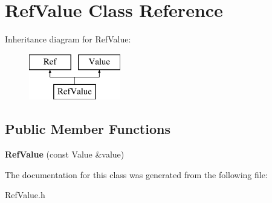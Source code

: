 \hypertarget{class_ref_value}{}\section{Ref\+Value Class Reference}
\label{class_ref_value}
Inheritance diagram for Ref\+Value\+:\begin{figure}[H]
\begin{center}
\leavevmode
\includegraphics[height=2.000000cm]{dd/df3/class_ref_value}
\end{center}
\end{figure}
\subsection*{Public Member Functions}
\begin{DoxyCompactItemize}
\item 
\mbox{\label{class_ref_value_ad87c727828fdb22b87e0cf31e53d04af}} 
{\bfseries Ref\+Value} (const Value \&value)
\end{DoxyCompactItemize}


The documentation for this class was generated from the following file\+:\begin{DoxyCompactItemize}
\item 
Ref\+Value.\+h\end{DoxyCompactItemize}
